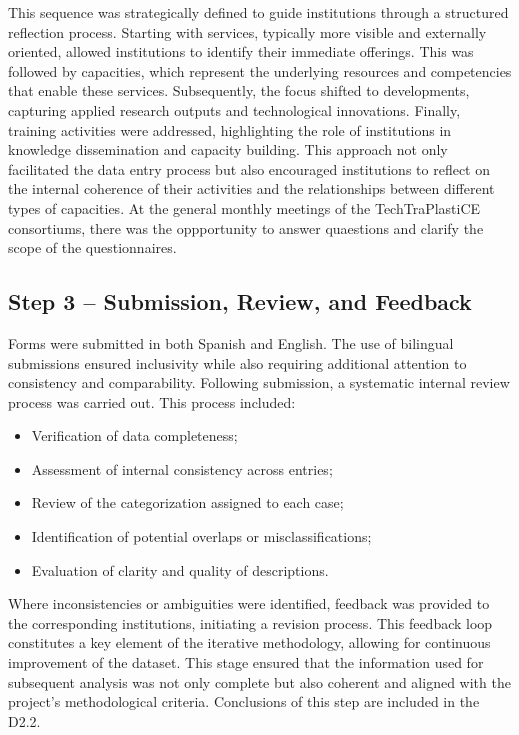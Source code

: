 \documentclass[
  12pt,
  oneside]{book}
\providecommand{\tightlist}{%
  \setlength{\itemsep}{0pt}\setlength{\parskip}{0pt}}
\begin{document}
This sequence was strategically defined to guide institutions through a
structured reflection process. Starting with services, typically more
visible and externally oriented, allowed institutions to identify their
immediate offerings. This was followed by capacities, which represent
the underlying resources and competencies that enable these services.
Subsequently, the focus shifted to developments, capturing applied
research outputs and technological innovations. Finally, training
activities were addressed, highlighting the role of institutions in
knowledge dissemination and capacity building. This approach not only
facilitated the data entry process but also encouraged institutions to
reflect on the internal coherence of their activities and the
relationships between different types of capacities. At the general
monthly meetings of the TechTraPlastiCE consortiums, there was the
oppportunity to answer quaestions and clarify the scope of the
questionnaires.

\subsection{Step 3 -- Submission, Review, and
Feedback}\label{step-3-submission-review-and-feedback}

Forms were submitted in both Spanish and English. The use of bilingual
submissions ensured inclusivity while also requiring additional
attention to consistency and comparability. Following submission, a
systematic internal review process was carried out. This process
included:

\begin{itemize}
\tightlist
\item
  Verification of data completeness;
\item
  Assessment of internal consistency across entries;
\item
  Review of the categorization assigned to each case;
\item
  Identification of potential overlaps or misclassifications;
\item
  Evaluation of clarity and quality of descriptions.
\end{itemize}

Where inconsistencies or ambiguities were identified, feedback was
provided to the corresponding institutions, initiating a revision
process. This feedback loop constitutes a key element of the iterative
methodology, allowing for continuous improvement of the dataset. This
stage ensured that the information used for subsequent analysis was not
only complete but also coherent and aligned with the project's
methodological criteria. Conclusions of this step are included in the
D2.2.
\end{document}
